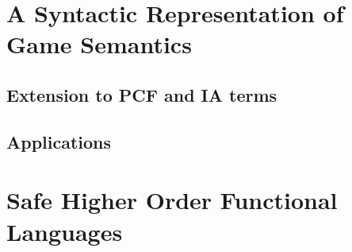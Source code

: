 \chapter{A Syntactic Representation of Game Semantics}

    


    \section{Extension to PCF and IA terms}
    \section{Applications}



\chapter{Safe Higher Order Functional Languages}

    

